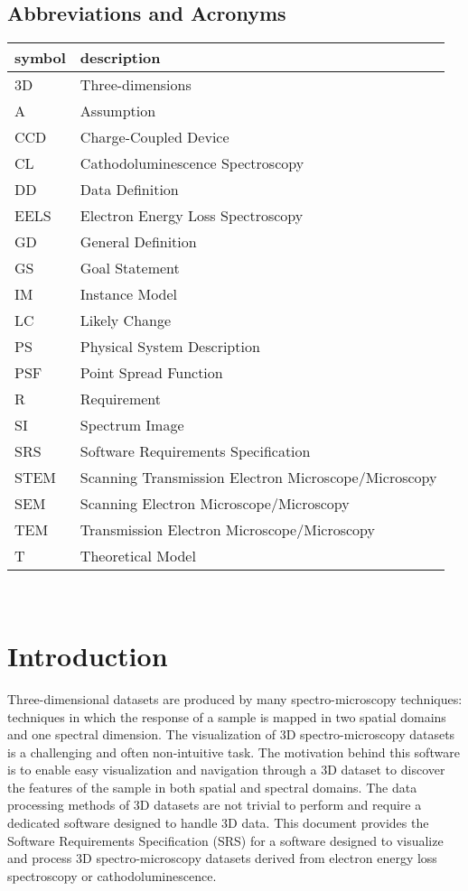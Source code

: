\documentclass[12pt]{article}
\begin{document}
\subsection{Abbreviations and Acronyms}

\renewcommand{\arraystretch}{1.2}
\begin{tabular}{l l} 
  \toprule		
  \textbf{symbol} & \textbf{description}\\
  \midrule 
  3D & Three-dimensions\\
  A & Assumption\\
  CCD & Charge-Coupled Device\\
  CL & Cathodoluminescence Spectroscopy\\
  DD & Data Definition\\
  EELS & Electron Energy Loss Spectroscopy\\
  GD & General Definition\\
  GS & Goal Statement\\
  IM & Instance Model\\
  LC & Likely Change\\
  PS & Physical System Description\\
  PSF & Point Spread Function\\
  R & Requirement\\
  SI & Spectrum Image\\
  SRS & Software Requirements Specification\\
  STEM & Scanning Transmission Electron Microscope/Microscopy\\
  SEM & Scanning Electron Microscope/Microscopy\\
  TEM & Transmission Electron Microscope/Microscopy\\
  T & Theoretical Model\\
  \bottomrule
\end{tabular}\\

\newpage
{}

\section{Introduction}
Three-dimensional datasets are produced by many spectro-microscopy techniques:
techniques in which the response of a sample is mapped in two spatial domains
and one spectral dimension. The visualization of 3D spectro-microscopy datasets
is a challenging and often non-intuitive task. The motivation behind this
software is to enable easy visualization and navigation through a 3D dataset to
discover the features of the sample in both spatial and spectral domains. The
data processing methods of 3D datasets are not trivial to perform and require a
dedicated software designed to handle 3D data. This document provides the
Software Requirements Specification (SRS) for a software designed to visualize
and process 3D spectro-microscopy datasets derived from electron energy loss
spectroscopy or cathodoluminescence.
\end{document}
